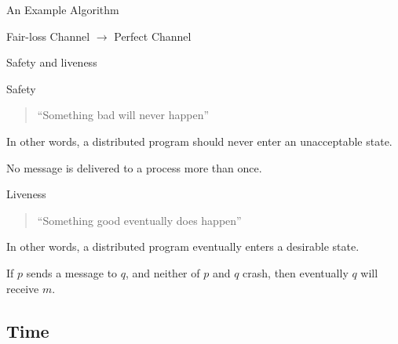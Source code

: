 \begin{frame}[shrink]{An Example Algorithm}

\begin{Procedure}
\caption{Fair-loss Channel $\rightarrow$ Perfect Channel}
\end{Procedure}

\end{frame}

\begin{frame}{Safety and liveness}
\begin{block}{Safety}
\begin{quote}	
``Something bad will never happen''
\end{quote}
  In other words, a distributed program should never enter an
  unacceptable state.
  \BI
  \item No message is delivered to a process more than once.
  \EI
\end{block}

\begin{block}{Liveness}
\begin{quote}	
``Something good eventually does happen''
\end{quote}	

  In other words, a distributed program \alert{eventually} enters a desirable
  state.
  \BI
  \item If $p$ sends a message to $q$, and neither of $p$ and $q$ crash, then \alert{eventually}
$q$ will receive $m$.
  \EI
\end{block} 
\end{frame}

\subsection{Time}

